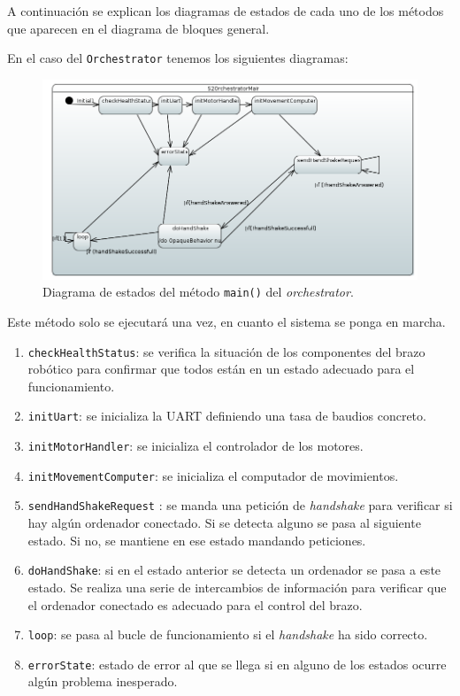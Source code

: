 A continuación se explican los diagramas de estados de cada uno de los métodos que aparecen en el diagrama de bloques general.

En el caso del \texttt{Orchestrator} tenemos los siguientes diagramas:

\begin{figure}[H]
    \centering
    \includegraphics[width=1\linewidth]{pictures/S2OrchestratorMain.PNG}
    \caption{Diagrama de estados del método \texttt{main()} del \textit{orchestrator}.}
    \label{fig:fun_main_orchestrator}
\end{figure}

Este método solo se ejecutará una vez, en cuanto el sistema se ponga en marcha. 

\begin{enumerate}
    \item \texttt{checkHealthStatus}: se verifica la situación de los componentes del brazo robótico para confirmar que todos están en un estado adecuado para el funcionamiento. 
    \item \texttt{initUart}: se inicializa la \ac{UART} definiendo una tasa de baudios concreto.
    \item \texttt{initMotorHandler}: se inicializa el controlador de los motores.
    \item \texttt{initMovementComputer}: se inicializa el computador de movimientos.
    \item \texttt{sendHandShakeRequest} : se manda una petición de \textit{handshake} para verificar si hay algún ordenador conectado. Si se detecta alguno se pasa al siguiente estado. Si no, se mantiene en ese estado mandando peticiones.
    \item \texttt{doHandShake}: si en el estado anterior se detecta un ordenador se pasa a este estado. Se realiza una serie de intercambios de información para verificar que el ordenador conectado es adecuado para el control del brazo.
    \item \texttt{loop}: se pasa al bucle de funcionamiento si el \textit{handshake} ha sido correcto.
    \item \texttt{errorState}: estado de error al que se llega si en alguno de los estados ocurre algún problema inesperado. 
\end{enumerate}

